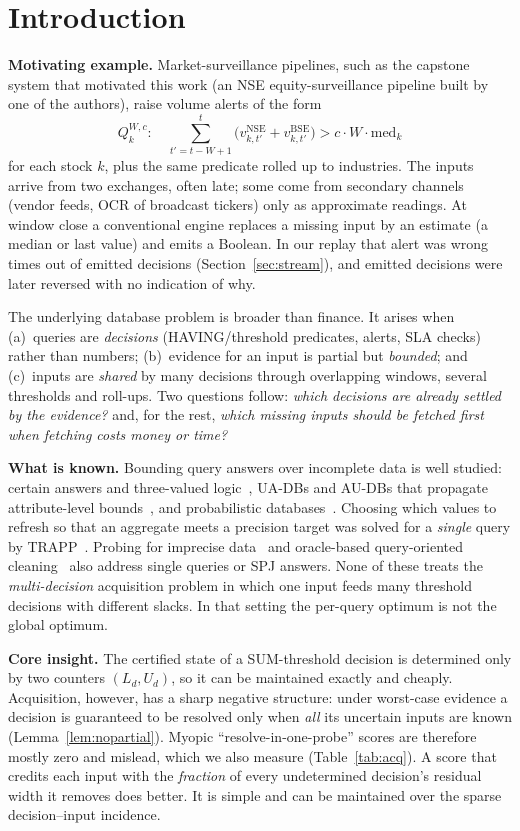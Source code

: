 \documentclass[conference]{IEEEtran}
\begin{document}
\section{Introduction}
\label{sec:intro}
\textbf{Motivating example.} Market-surveillance pipelines, such as the capstone system that motivated this work
(an NSE equity-surveillance pipeline built by one of the authors), raise volume alerts of the form
\[
\textstyle Q_{k}^{W,c}:\quad \sum_{t'=t-W+1}^{t}\big(v^{\text{NSE}}_{k,t'}+v^{\text{BSE}}_{k,t'}\big) > c\cdot W\cdot \mathrm{med}_k
\]
for each stock $k$, plus the same predicate rolled up to industries. The inputs arrive from two exchanges,
often late; some come from secondary channels (vendor feeds, OCR of broadcast tickers) only as approximate
readings. At window close a conventional engine replaces a missing input by an estimate (a median or last value) and
emits a Boolean. In our replay that alert was wrong \stpointWrong{} times out of \stpointTotal{} emitted decisions
(Section~\ref{sec:stream}), and \stpointRev{} emitted decisions were later reversed with no indication of why.

The underlying database problem is broader than finance. It arises when (a)~queries are \emph{decisions}
(HAVING/threshold predicates, alerts, SLA checks) rather than numbers; (b)~evidence for an input is partial but
\emph{bounded}; and (c)~inputs are \emph{shared} by many decisions through overlapping windows, several thresholds and
roll-ups. Two questions follow: \emph{which decisions are already settled by the evidence?} and, for the rest,
\emph{which missing inputs should be fetched first when fetching costs money or time?}

\textbf{What is known.} Bounding query answers over incomplete data is well studied: certain answers and
three-valued logic~\cite{imielinski1984,libkin2016}, UA-DBs and AU-DBs that propagate attribute-level
bounds~\cite{feng2019uadb,feng2021audb}, and probabilistic databases~\cite{dalvi2004,antova2007}. Choosing which
values to refresh so that an aggregate meets a precision target was solved for a \emph{single} query by
TRAPP~\cite{olston2000trapp}. Probing for imprecise data~\cite{cheng2003} and oracle-based query-oriented
cleaning~\cite{bergman2015qoco} also address single queries or SPJ answers. None of these treats the
\emph{multi-decision} acquisition problem in which one input feeds many threshold decisions with different slacks.
In that setting the per-query optimum is not the global optimum.

\textbf{Core insight.} The certified state of a SUM-threshold decision is determined only by two counters
$(L_d,U_d)$, so it can be maintained exactly and cheaply. Acquisition, however, has a sharp negative structure:
under worst-case evidence a decision is guaranteed to be resolved only when \emph{all} its uncertain inputs are known
(Lemma~\ref{lem:nopartial}). Myopic ``resolve-in-one-probe'' scores are therefore mostly zero and mislead, which we
also measure (Table~\ref{tab:acq}). A score that credits each input with the \emph{fraction} of every undetermined
decision's residual width it removes does better. It is simple and can be maintained over the sparse decision--input
incidence.
\end{document}

